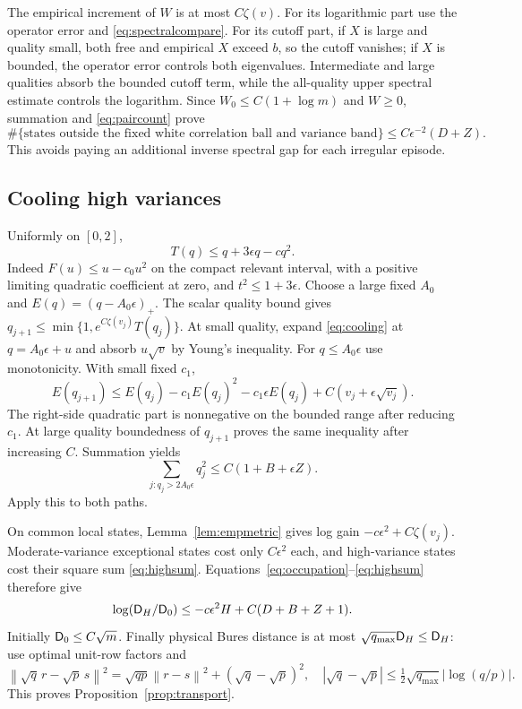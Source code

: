 \documentclass[11pt]{article}
\newcommand{\norm}[1]{\left\lVert#1\right\rVert}
\begin{document}
The empirical increment of $W$ is at most $C\zeta(v)$. For its logarithmic part use the operator error and \eqref{eq:spectralcompare}. For its cutoff part, if $X$ is large and quality small, both free and empirical $X$ exceed $b$, so the cutoff vanishes; if $X$ is bounded, the operator error controls both eigenvalues. Intermediate and large qualities absorb the bounded cutoff term, while the all-quality upper spectral estimate controls the logarithm. Since $W_0\le C(1+\log m)$ and $W\ge0$, summation and \eqref{eq:paircount} prove
\begin{equation}\label{eq:occupation}
 \#\{\text{states outside the fixed white correlation ball and variance band}\}
 \le C\epsilon^{-2}(D+Z).
\end{equation}
This avoids paying an additional inverse spectral gap for each irregular episode.

\subsection{Cooling high variances}
Uniformly on $[0,2]$,
\begin{equation}\label{eq:cooling}
 T(q)\le q+3\epsilon q-cq^2.
\end{equation}
Indeed $F(u)\le u-c_0u^2$ on the compact relevant interval, with a positive limiting quadratic coefficient at zero, and $t^2\le1+3\epsilon$. Choose a large fixed $A_0$ and $E(q)=(q-A_0\epsilon)_+$. The scalar quality bound gives $q_{j+1}\le\min\{1,e^{C\zeta(v_j)}T(q_j)\}$. At small quality, expand \eqref{eq:cooling} at $q=A_0\epsilon+u$ and absorb $u\sqrt v$ by Young's inequality. For $q\le A_0\epsilon$ use monotonicity. With small fixed $c_1$,
\begin{equation}\label{eq:excess}
 E(q_{j+1})\le E(q_j)-c_1E(q_j)^2-c_1\epsilon E(q_j)
                    +C(v_j+\epsilon\sqrt{v_j}).
\end{equation}
The right-side quadratic part is nonnegative on the bounded range after reducing $c_1$. At large quality boundedness of $q_{j+1}$ proves the same inequality after increasing $C$. Summation yields
\begin{equation}\label{eq:highsum}
 \sum_{j:q_j>2A_0\epsilon}q_j^2\le C(1+B+\epsilon Z).
\end{equation}
Apply this to both paths.

On common local states, Lemma~\ref{lem:empmetric} gives log gain $-c\epsilon^2+C\zeta(v_j)$. Moderate-variance exceptional states cost only $C\epsilon^2$ each, and high-variance states cost their square sum \eqref{eq:highsum}. Equations~\eqref{eq:occupation}--\eqref{eq:highsum} therefore give
\[
 \log(\mathsf D_H/\mathsf D_0)\le-c\epsilon^2H+C(D+B+Z+1).
\]
Initially $\mathsf D_0\le C\sqrt m$. Finally physical Bures distance is at most $\sqrt{q_{\max}}\mathsf D_H\le\mathsf D_H$: use optimal unit-row factors and
\[
 \norm{\sqrt q\,r-\sqrt p\,s}^2=\sqrt{qp}\norm{r-s}^2+(\sqrt q-\sqrt p)^2,
 \quad |\sqrt q-\sqrt p|\le\tfrac12\sqrt{q_{\max}}|\log(q/p)|.
\]
This proves Proposition~\ref{prop:transport}.
\end{document}
